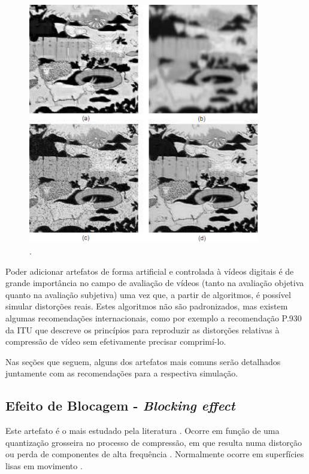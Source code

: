 \begin{figure}[!htb]
	\centering
	\includegraphics[width=0.9\textwidth]{./imgs/artefatosdigitais.png}
	\caption{.}
	\label{fig:artefatosdigitais}
\end{figure}

Poder adicionar artefatos de forma artificial e controlada à vídeos digitais é de grande importância no campo de avaliação de vídeos (tanto na avaliação objetiva quanto na avaliação subjetiva) uma vez que, a partir de algoritmos, é possível simular distorções reais. Estes algoritmos não são padronizados, mas existem algumas recomendações internacionais, como por exemplo a recomendação P.930 da ITU \cite{itup930} que descreve os princípios para reproduzir as distorções relativas à compressão de vídeo sem efetivamente precisar comprimí-lo.

Nas seções que seguem, alguns dos artefatos mais comuns serão detalhados juntamente com as recomendações para a respectiva simulação.

\subsection{Efeito de Blocagem - \emph{Blocking effect}}

Este artefato é o mais estudado pela literatura \cite{emmersonsilva}. Ocorre em função de uma quantização grosseira no processo de compressão, em que resulta numa distorção ou perda de componentes de alta frequência \cite{itup930}. Normalmente ocorre em superfícies lisas em movimento \cite{itup930} \cite{farias2007}.

